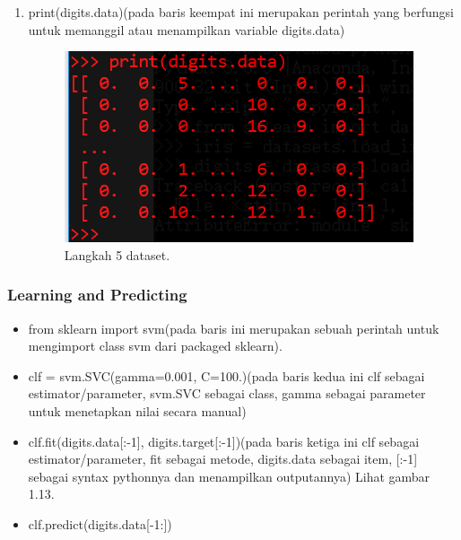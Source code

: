 \begin{enumerate}
\item print(digits.data)(pada baris keempat ini merupakan perintah yang berfungsi untuk memanggil atau menampilkan variable digits.data)
\begin{figure} [ht]
\centering 
\includegraphics[scale=1] {figures/10.png}
\caption{Langkah 5 dataset. }
\end{figure}
\end{enumerate}

\subsubsection{Learning and Predicting}
\begin{itemize}
\item from sklearn import svm(pada baris ini merupakan sebuah perintah untuk mengimport class svm dari packaged sklearn).
\item clf = svm.SVC(gamma=0.001, C=100.)(pada baris kedua ini clf sebagai estimator/parameter, svm.SVC sebagai class, gamma sebagai parameter untuk menetapkan nilai secara manual)
\item clf.fit(digits.data[:-1], digits.target[:-1])(pada baris ketiga ini clf sebagai estimator/parameter, fit sebagai metode, digits.data sebagai item, [:-1] sebagai syntax pythonnya dan menampilkan outputannya) Lihat gambar 1.13.
\item clf.predict(digits.data[-1:])
\end{itemize}

